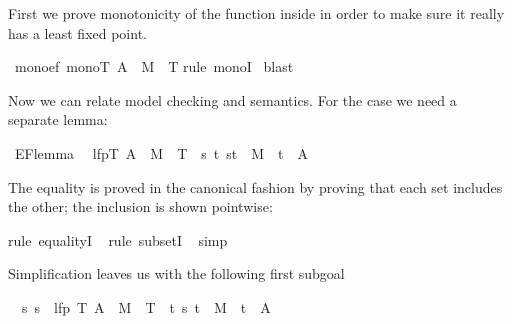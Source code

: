 \begin{isabellebody}
\begin{isamarkuptext}
First we prove monotonicity of the function inside 
in order to make sure it really has a least fixed point.%
\end{isamarkuptext}%
\isamarkuptrue%
\isamarkupfalse%
\ mono{\isacharunderscore}ef{\isacharcolon}\ {\isachardoublequoteopen}mono{\isacharparenleft}{\isasymlambda}T{\isachardot}\ A\ {\isasymunion}\ {\isacharparenleft}M{\isasyminverse}\ {\isacharbackquote}{\isacharbackquote}\ T{\isacharparenright}{\isacharparenright}{\isachardoublequoteclose}\isanewline
%
\isadelimproof
%
\endisadelimproof
%
\isatagproof
{}\isamarkupfalse%
{\isacharparenleft}rule\ monoI{\isacharparenright}\isanewline
{}\isamarkupfalse%
\ blast\isanewline
{}\isamarkupfalse%
%
\endisatagproof
{\isafoldproof}%
%
\isadelimproof
%
\endisadelimproof
%
\begin{isamarkuptext}%
\noindent
Now we can relate model checking and semantics. For the  case we need
a separate lemma:%
\end{isamarkuptext}%
\isamarkuptrue%
\isamarkupfalse%
\ EF{\isacharunderscore}lemma{\isacharcolon}\isanewline
\ \ {\isachardoublequoteopen}lfp{\isacharparenleft}{\isasymlambda}T{\isachardot}\ A\ {\isasymunion}\ {\isacharparenleft}M{\isasyminverse}\ {\isacharbackquote}{\isacharbackquote}\ T{\isacharparenright}{\isacharparenright}\ {\isacharequal}\ {\isacharbraceleft}s{\isachardot}\ {\isasymexists}t{\isachardot}\ {\isacharparenleft}s{\isacharcomma}t{\isacharparenright}\ {\isasymin}\ M\isactrlsup {\isacharasterisk}\ {\isasymand}\ t\ {\isasymin}\ A{\isacharbraceright}{\isachardoublequoteclose}%
\isadelimproof
%
\endisadelimproof
%
\isatagproof
%
\begin{isamarkuptxt}%
\noindent
The equality is proved in the canonical fashion by proving that each set
includes the other; the inclusion is shown pointwise:%
\end{isamarkuptxt}%
\isamarkuptrue%
\isamarkupfalse%
{\isacharparenleft}rule\ equalityI{\isacharparenright}\isanewline
\ \isamarkupfalse%
{\isacharparenleft}rule\ subsetI{\isacharparenright}\isanewline
\ \isamarkupfalse%
{\isacharparenleft}simp{\isacharparenright}\isamarkupfalse%
%
\begin{isamarkuptxt}%
\noindent
Simplification leaves us with the following first subgoal
\begin{isabelle}%
\ {}{\isachardot}\ {\isasymAnd}s{\isachardot}\ s\ {\isasymin}\ lfp\ {\isacharparenleft}{\isasymlambda}T{\isachardot}\ A\ {\isasymunion}\ M{\isasyminverse}\ {\isacharbackquote}{\isacharbackquote}\ T{\isacharparenright}\ {\isasymLongrightarrow}\ {\isasymexists}t{\isachardot}\ {\isacharparenleft}s{\isacharcomma}\ t{\isacharparenright}\ {\isasymin}\ M\isactrlsup {\isacharasterisk}\ {\isasymand}\ t\ {\isasymin}\ A%

\end{isabelle}
\end{isamarkuptxt}
\end{isabellebody}
